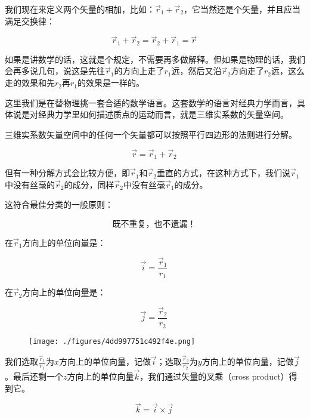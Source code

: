 我们现在来定义两个矢量的相加，比如：$\vec r_1 + \vec r_2$，它当然还是个矢量，并且应当满足交换律：

\begin{equation}
\vec r_1 + \vec r_2 = \vec r_2 + \vec r_1 = \vec r~
\end{equation}

如果是讲数学的话，这就是个规定，不需要再多做解释。但如果是物理的话，我们会再多说几句，说这是先往$\vec r_1$的方向上走了$r_1$远，然后又沿$\vec r_2$方向走了$r_2$远，这么走的效果和先$r_2$再$r_1$的效果是一样的。

这里我们是在替物理挑一套合适的数学语言。这套数学的语言对经典力学而言，具体说是对经典力学里如何描述质点的运动而言，就是三维实系数的矢量空间。

三维实系数矢量空间中的任何一个矢量都可以按照平行四边形的法则进行分解。

\begin{equation}
\vec r = \vec r_1 + \vec r_2~
\end{equation}

但有一种分解方式会比较方便，即$\vec r_1$和$\vec r_2$垂直的方式，在这种方式下，我们说$\vec r_1$中没有丝毫的$\vec r_2$的成分，同样$\vec r_2$中没有丝毫$\vec r_1$的成分。

这符合最佳分类的一般原则：

\begin{equation}
\text{既不重复，也不遗漏！}~
\end{equation}

在$\vec r_1$方向上的单位向量是：

\begin{equation}
\vec i = \frac{\vec r_1}{r_1}~
\end{equation}

在$\vec r_2$方向上的单位向量是：

\begin{equation}
\vec j = \frac{\vec r_2}{r_2}~
\end{equation}

\begin{figure}[ht]
\centering
\texttt{[image: ./figures/4dd997751c492f4e.png]}
\caption \label{fig_QMPre6_5}
\end{figure}

我们选取$\frac{\vec r_1}{r_1}$为$x$方向上的单位向量，记做$\vec i$；选取$\frac{\vec r_2}{r_2}$为$y$方向上的单位向量，记做$\vec j$。最后还剩一个$z$方向上的单位向量$\vec k$，我们通过矢量的叉乘（cross product）得到它。

\begin{equation}
\vec k = \vec i \times \vec j~
\end{equation}


